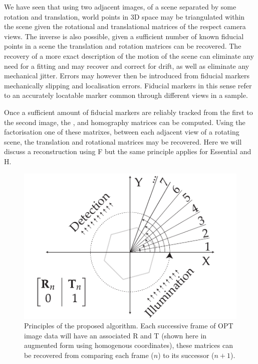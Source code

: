 We have seen that using two adjacent images, of a scene separated by some rotation and translation, world points in \gls{3D} space may be triangulated within the scene given the rotational and translational matrices of the respect camera views.
The inverse is also possible, given a sufficient number of known fiducial points in a scene the translation and rotation matrices can be recovered.
The recovery of a more exact description of the motion of the scene can eliminate any need for a fitting and may recover and correct for drift, as well as eliminate any mechanical jitter.
Errors may however then be introduced from fiducial markers mechanically slipping and localisation errors.
Fiducial markers in this sense refer to an accurately locatable marker common through different views in a sample.

Once a sufficient amount of fiducial markers are reliably tracked from the first to the second image, the ,  and \Gls{homography} matrices can be computed.
Using the factorisation one of these matrixes, between each adjacent view of a rotating scene, the translation and rotational matrices may be recovered.
Here we will discuss a reconstruction using \gls{F} but the same principle applies for \gls{Essential} and \gls{H}.

\begin{figure}
  \centering
  \includegraphics{Chapters/flopt/Figs/PDF/flOPT_principle}
  \caption[Principles of the proposed algorithm]{Principles of the proposed algorithm. Each successive frame of \gls{OPT} image data will have an associated \gls{R} and \gls{T} (shown here in augmented form using homogenous coordinates), these matrices can be recovered from comparing each frame (\(n\)) to its successor (\(n+1\)).}
\end{figure}

